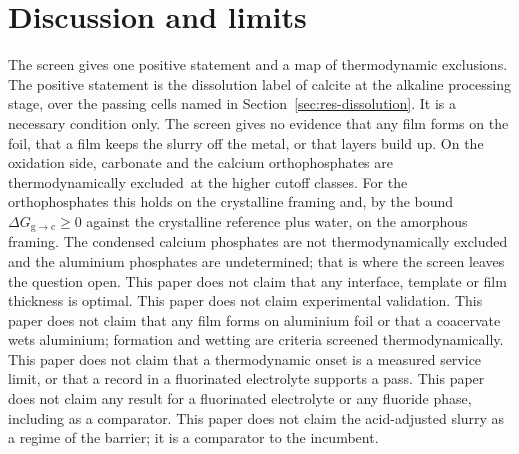 \section{Discussion and limits}\label{sec:discussion}

The screen gives one positive statement and a map of thermodynamic exclusions. %
The positive statement is the dissolution label of calcite at the alkaline processing stage, over the passing cells named in Section~\ref{sec:res-dissolution}. %
It is a necessary condition only. %
The screen gives no evidence that any film forms on the foil, that a film keeps the slurry off the metal, or that layers build up. %
On the oxidation side, carbonate and the calcium orthophosphates are thermodynamically excluded\nacreExcludedMark\nacreSinkMark\ at the higher cutoff classes. %
For the orthophosphates this holds on the crystalline framing and, by the bound $\Delta G_{\mathrm{g}\to\mathrm{c}}\ge0$ against the crystalline reference plus water, on the amorphous framing. %
The condensed calcium phosphates are not thermodynamically excluded and the aluminium phosphates are undetermined; that is where the screen leaves the question open. %
This paper does not claim that any interface, template or film thickness is optimal.
This paper does not claim experimental validation.
This paper does not claim that any film forms on aluminium foil or that a coacervate wets aluminium; formation and wetting are criteria screened thermodynamically.
This paper does not claim that a thermodynamic onset is a measured service limit, or that a record in a fluorinated electrolyte supports a pass.
This paper does not claim any result for a fluorinated electrolyte or any fluoride phase, including as a comparator.
This paper does not claim the acid-adjusted slurry as a regime of the barrier; it is a comparator to the incumbent.

